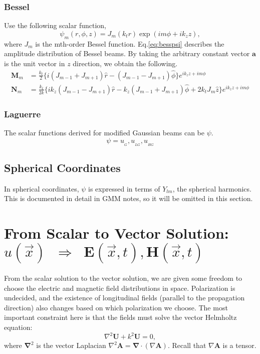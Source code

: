 \documentclass[11pt,letterpaper]{article}
\newcommand{\del}{\boldsymbol\nabla}
\begin{document}
\subsubsection{Bessel}
Use the following scalar function,
\begin{equation}\label{eq:besspsi}
\psi_m (r,\phi,z) = J_m(k_t r) \exp(im\phi + i k_z z) ,
\end{equation}
where $J_m$ is the mth-order Bessel function. Eq.\ref{eq:besspsi} describes the amplitude distribution of Bessel beams. 
By taking the arbitrary constant vector $\mathbf{a}$ is the unit vector in $z$ direction, we obtain the following. 
\begin{align}
\mathbf{M}_m &= \frac{k_t}{2}\lbrace i(J_{m-1}+J_{m+1} )\hat{r} - (J_{m-1}-J_{m+1})\hat{\phi}\rbrace e^{ik_z z +im\phi}\\
\mathbf{N}_m &= \frac{k_t}{2k} \lbrace ik_z(J_{m-1}-J_{m+1} )\hat{r} -k_z (J_{m-1}+J_{m+1})\hat{\phi}+2k_t J_m \hat{z} \rbrace e^{ik_z z +im\phi}
\end{align}

\subsubsection{Laguerre}
The scalar functions derived for modified Gaussian beams can be $\psi$.
\begin{equation}
\psi = u_{_G}, u_{_{LG}}, u_{_{HG}}
\end{equation}

\subsection{Spherical Coordinates}
In spherical coordinates, $\psi$ is expressed in terms of $Y_{lm}$, the spherical harmonics. This is documented in detail in GMM notes, so it will be omitted in this section. 


\section{From Scalar to Vector Solution: $u(\vec{x})\;\;\Rightarrow\;\;\mathbf{E}(\vec{x},t),\mathbf{H}(\vec{x},t)$}
From the scalar solution to the vector solution, we are given some freedom to choose the electric and magnetic field distributions in space. Polarization is undecided, and the existence of longitudinal fields (parallel to the propagation direction) also changes based on which polarization we choose. The most important constraint here is that the fields must solve the vector Helmholtz equation:
\begin{equation}\label{eq:VectorHelmholtz}
\nabla^2 \mathbf{U} + k^2 \mathbf{U} = 0,
\end{equation}
where $\boldsymbol\nabla^2$ is the vector Laplacian $ \nabla^2 \mathbf{A}= \del \cdot (\nabla \mathbf{A}) $. Recall that $\nabla \mathbf{A}$ is a tensor. 
\end{document}
